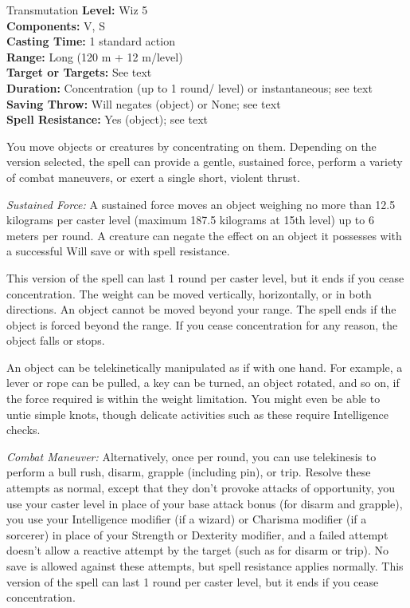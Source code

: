 {Transmutation}
{
	\textbf{Level:}
	Wiz 5\\
	\textbf{Components:}
	V, S\\
	\textbf{Casting Time:}
	1 standard action\\
	\textbf{Range:}
	Long (120 m + 12 m/level)\\
	\textbf{Target or Targets:}
	See text\\
	\textbf{Duration:}
	Concentration (up to 1 round/ level) or instantaneous; see text\\
	\textbf{Saving Throw:}
	Will negates (object) or None; see text\\
	\textbf{Spell Resistance:}
	Yes (object); see text\\
}
{
	You move objects or creatures by concentrating on them. Depending on the version selected, the spell can provide a gentle, sustained force, perform a variety of combat maneuvers, or exert a single short, violent thrust.

	\textit{Sustained Force:}
	A sustained force moves an object weighing no more than 12.5 kilograms per caster level (maximum 187.5 kilograms at 15th level) up to 6 meters per round. A creature can negate the effect on an object it possesses with a successful Will save or with spell resistance.

	This version of the spell can last 1 round per caster level, but it ends if you cease concentration. The weight can be moved vertically, horizontally, or in both directions. An object cannot be moved beyond your range. The spell ends if the object is forced beyond the range. If you cease concentration for any reason, the object falls or stops.

	An object can be telekinetically manipulated as if with one hand. For example, a lever or rope can be pulled, a key can be turned, an object rotated, and so on, if the force required is within the weight limitation. You might even be able to untie simple knots, though delicate activities such as these require Intelligence checks.

	\textit{Combat Maneuver:}
	Alternatively, once per round, you can use telekinesis to perform a bull rush, disarm, grapple (including pin), or trip. Resolve these attempts as normal, except that they don't provoke attacks of opportunity, you use your caster level in place of your base attack bonus (for disarm and grapple), you use your Intelligence modifier (if a wizard) or Charisma modifier (if a sorcerer) in place of your Strength or Dexterity modifier, and a failed attempt doesn't allow a reactive attempt by the target (such as for disarm or trip). No save is allowed against these attempts, but spell resistance applies normally. This version of the spell can last 1 round per caster level, but it ends if you cease concentration.

}
